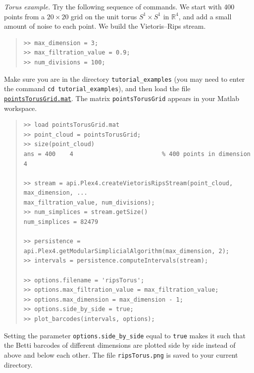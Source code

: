 \documentclass[amscd, amssymb, verbatim]{amsart}[12pt]
\theoremstyle{remark}
\theoremstyle{remark}
\theoremstyle{remark}
\begin{document}


{\em Torus example.} Try the following sequence of commands. We start with 400 points from a $20 \times 20$ grid on the unit torus $S^1 \times S^1$ in $\mathbb{R}^4$, and add a small amount of noise to each point.
We build the Vietoris--Rips stream.

\begin{quote} \begin{verbatim}
>> max_dimension = 3;
>> max_filtration_value = 0.9;
>> num_divisions = 100;
\end{verbatim} \end{quote}

Make sure you are in the directory \texttt{tutorial\_examples} (you may need to enter the command \texttt{cd tutorial\_examples}), and then load the file \href{https://github.com/appliedtopology/javaplex/tree/master/src/matlab/for_distribution/tutorial_examples/pointsTorusGrid.mat}{\texttt{pointsTorusGrid.mat}}. The matrix \texttt{pointsTorusGrid} appears in your Matlab workspace.

\begin{quote} \begin{verbatim}
>> load pointsTorusGrid.mat
>> point_cloud = pointsTorusGrid;
>> size(point_cloud)
ans = 400    4                         % 400 points in dimension 4

>> stream = api.Plex4.createVietorisRipsStream(point_cloud, max_dimension, ...
max_filtration_value, num_divisions); 
>> num_simplices = stream.getSize()
num_simplices = 82479

>> persistence = api.Plex4.getModularSimplicialAlgorithm(max_dimension, 2);
>> intervals = persistence.computeIntervals(stream);

>> options.filename = 'ripsTorus';
>> options.max_filtration_value = max_filtration_value;
>> options.max_dimension = max_dimension - 1;
>> options.side_by_side = true;
>> plot_barcodes(intervals, options);
\end{verbatim} \end{quote}

Setting the parameter \texttt{options.side\_by\_side} equal to \texttt{true} makes it such that the Betti barcodes of different dimensions are plotted side by side instead of above and below each other. The file \texttt{ripsTorus.png} is saved to your current directory.
\end{document}
